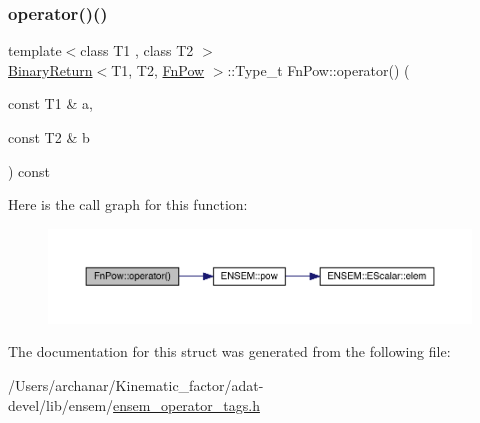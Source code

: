 \subsubsection{\texorpdfstring{operator()()}{operator()()}\hspace{0.1cm}{\footnotesize\ttfamily [3/3]}}
{\footnotesize\ttfamily template$<$class T1 , class T2 $>$ \\
\mbox{\hyperlink{structBinaryReturn}{Binary\+Return}}$<$T1, T2, \mbox{\hyperlink{structFnPow}{Fn\+Pow}} $>$\+::Type\+\_\+t Fn\+Pow\+::operator() (\begin{DoxyParamCaption}\item[{const T1 \&}]{a,  }\item[{const T2 \&}]{b }\end{DoxyParamCaption}) const\hspace{0.3cm}{\ttfamily [inline]}}

Here is the call graph for this function\+:
\nopagebreak
\begin{figure}[H]
\begin{center}
\leavevmode
\includegraphics[width=350pt]{db/dec/structFnPow_ae45f2e7b97a332060329770959c524c7_cgraph}
\end{center}
\end{figure}


The documentation for this struct was generated from the following file\+:\begin{DoxyCompactItemize}
\item 
/\+Users/archanar/\+Kinematic\+\_\+factor/adat-\/devel/lib/ensem/\mbox{\hyperlink{adat-devel_2lib_2ensem_2ensem__operator__tags_8h}{ensem\+\_\+operator\+\_\+tags.\+h}}\end{DoxyCompactItemize}

